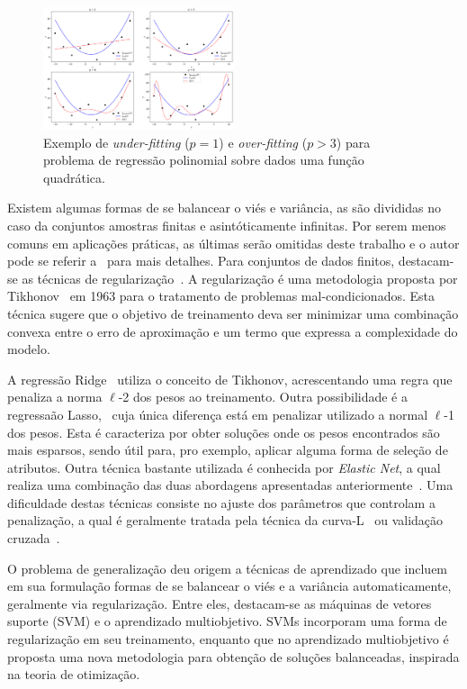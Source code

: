 \documentclass[conference]{IEEEtran}
\begin{document}
    \begin{figure}[thpbh]
    	\centering
    	\includegraphics[width=0.5\textwidth]{bias-var-example.png}
	    \caption{Exemplo de \textit{under-fitting} ($p=1$) e \textit{over-fitting} ($p > 3$) para problema de regressão polinomial sobre dados uma função quadrática.}
	    \label{fig:bias-var}
    \end{figure}
    
	Existem algumas formas de se balancear o viés e variância, as são divididas no caso da conjuntos amostras finitas e asintóticamente infinitas. Por serem menos comuns em aplicações práticas, as últimas serão omitidas deste trabalho e o autor pode se referir a~\cite{geman1992neural} para mais detalhes. 
	Para conjuntos de dados finitos, destacam-se as técnicas de regularização~\cite{girosi1995regularization}. A regularização é uma metodologia proposta por Tikhonov~\cite{tikhonov1963solution} em 1963 para o tratamento de problemas mal-condicionados. Esta técnica sugere que o objetivo de treinamento deva ser minimizar uma combinação convexa entre o erro de aproximação e um termo que expressa a complexidade do modelo. 
	
	A regressão Ridge~\cite{hoerl1970ridge} utiliza o conceito de Tikhonov, acrescentando uma regra que penaliza a norma $\ell$-2 dos pesos ao treinamento. Outra possibilidade é a regressaão Lasso,~\cite{tibshirani2011regression} cuja única diferença está em penalizar utilizado a normal $\ell$-1 dos pesos. Esta é caracteriza por obter soluções onde os pesos encontrados são mais esparsos, sendo útil para, pro exemplo, aplicar alguma forma de seleção de atributos. Outra técnica bastante utilizada é conhecida por \textit{Elastic Net}, a qual realiza uma combinação das duas abordagens apresentadas anteriormente~\cite{zou2005regularization}. Uma dificuldade destas técnicas consiste no ajuste dos parâmetros que controlam a penalização, a qual é geralmente tratada pela técnica da curva-L~\cite{hansen1993use} ou validação cruzada~\cite{arlot2010survey}.
	
	O problema de generalização deu origem a técnicas de aprendizado que incluem em sua formulação formas de se balancear o viés e a variância automaticamente, geralmente via regularização. Entre eles, destacam-se as máquinas de vetores suporte (SVM) e o aprendizado multiobjetivo. SVMs incorporam uma forma de regularização em seu treinamento, enquanto que no aprendizado multiobjetivo é proposta uma nova metodologia para obtenção de soluções balanceadas, inspirada na teoria de otimização.
	
\end{document}
